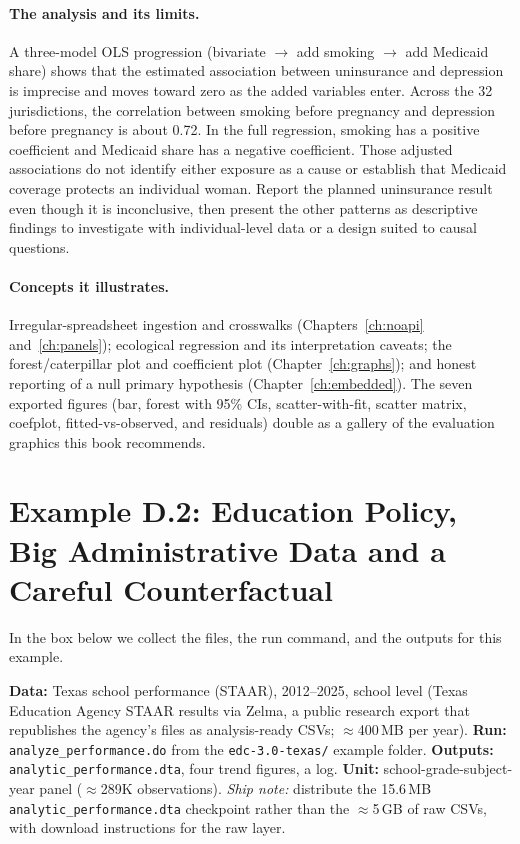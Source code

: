 \paragraph{The analysis and its limits.} A three-model OLS progression (bivariate $\rightarrow$ add smoking $\rightarrow$ add Medicaid share) shows that the estimated association between uninsurance and depression is imprecise and moves toward zero as the added variables enter. Across the 32 jurisdictions, the correlation between smoking before pregnancy and depression before pregnancy is about 0.72. In the full regression, smoking has a positive coefficient and Medicaid share has a negative coefficient. Those adjusted associations do not identify either exposure as a cause or establish that Medicaid coverage protects an individual woman. Report the planned uninsurance result even though it is inconclusive, then present the other patterns as descriptive findings to investigate with individual-level data or a design suited to causal questions.

\paragraph{Concepts it illustrates.} Irregular-spreadsheet ingestion and crosswalks (Chapters~\ref{ch:noapi} and~\ref{ch:panels}); ecological regression and its interpretation caveats; the forest/caterpillar plot and coefficient plot (Chapter~\ref{ch:graphs}); and honest reporting of a null primary hypothesis (Chapter~\ref{ch:embedded}). The seven exported figures (bar, forest with 95\% CIs, scatter-with-fit, scatter matrix, coefplot, fitted-vs-observed, and residuals) double as a gallery of the evaluation graphics this book recommends.

\section*{Example D.2: Education Policy, Big Administrative Data and a Careful Counterfactual}
In the box below we collect the files, the run command, and the outputs for this example.
\begin{kaobox}[frametitle=Get the files: \texttt{edc-3.0-texas/}]
\textbf{Data:} Texas school performance (STAAR), 2012--2025, school level (Texas Education Agency STAAR results via Zelma, a public research export that republishes the agency's files as analysis-ready CSVs; $\approx$400\,MB per year).
\textbf{Run:} \texttt{analyze\_performance.do} from the \texttt{edc-3.0-texas/} example folder. \textbf{Outputs:} \texttt{analytic\_performance.dta}, four trend figures, a log.
\textbf{Unit:} school-grade-subject-year panel ($\approx$289K observations). \emph{Ship note:} distribute the 15.6\,MB \texttt{analytic\_performance.dta} checkpoint rather than the $\approx$5\,GB of raw CSVs, with download instructions for the raw layer.
\end{kaobox}

